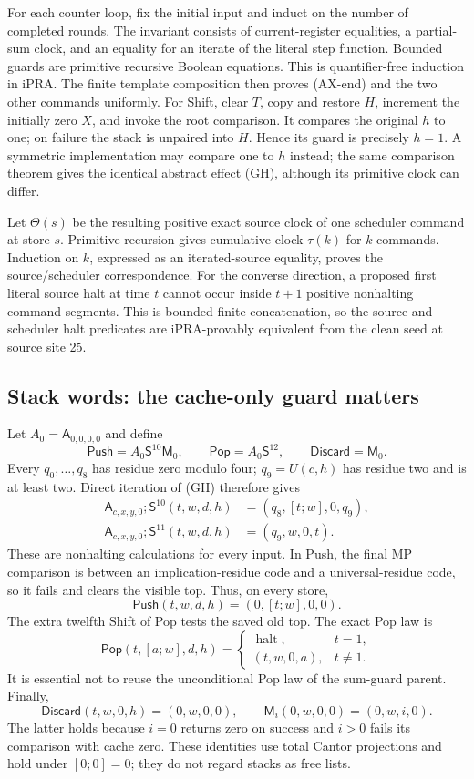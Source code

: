 For each counter loop, fix the initial input and induct on the number of
completed rounds.  The invariant consists of current-register equalities,
a partial-sum clock, and an equality for an iterate of the literal step
function.  Bounded guards are primitive recursive Boolean equations.
This is quantifier-free induction in iPRA.  The finite template composition
then proves (AX-end) and the two other commands uniformly.
For Shift, clear $T$, copy and restore $H$, increment the initially zero
$X$, and invoke the root comparison.  It compares the original $h$ to one;
on failure the stack is unpaired into $H$.  Hence its guard is precisely
$h=1$.  A symmetric implementation may compare one to $h$ instead; the
same comparison theorem gives the identical abstract effect (GH), although
its primitive clock can differ.

Let $\Theta(s)$ be the resulting positive exact source clock of one
scheduler command at store $s$.  Primitive recursion gives cumulative
clock $\tau(k)$ for $k$ commands.  Induction on $k$, expressed as an
iterated-source equality, proves the source/scheduler correspondence.  For
the converse direction, a proposed first literal source halt at time $t$
cannot occur inside $t+1$ positive nonhalting command segments.  This is
bounded finite concatenation, so the source and scheduler halt predicates
are iPRA-provably equivalent from the clean seed at source site 25.

\subsection{Stack words: the cache-only guard matters}

Let $A_0=\mathsf A_{0,0,0,0}$ and define
\[
 \mathsf{Push}=A_0\mathsf S^{10}\mathsf M_0,\qquad
 \mathsf{Pop}=A_0\mathsf S^{12},\qquad
 \mathsf{Discard}=\mathsf M_0.
\]
Every $q_0,\ldots,q_8$ has residue zero modulo four; $q_9=U(c,h)$ has
residue two and is at least two.  Direct iteration of (GH) therefore gives
\begin{align*}
 \mathsf A_{c,x,y,0};\mathsf S^{10}(t,w,d,h)
    &=(q_8,[t;w],0,q_9),\\
 \mathsf A_{c,x,y,0};\mathsf S^{11}(t,w,d,h)
    &=(q_9,w,0,t).
\end{align*}
These are nonhalting calculations for every input.  In Push, the final MP
comparison is between an implication-residue code and a universal-residue
code, so it fails and clears the visible top.  Thus, on every store,
\[
 \mathsf{Push}(t,w,d,h)=(0,[t;w],0,0).
\]
The extra twelfth Shift of Pop tests the saved old top.  The exact Pop law is
\[
 \mathsf{Pop}(t,[a;w],d,h)=
 \begin{cases}\operatorname{halt},&t=1,\\(t,w,0,a),&t\ne1.\end{cases} \tag{Pop}
\]
It is essential not to reuse the unconditional Pop law of the sum-guard
parent.  Finally,
\[
 \mathsf{Discard}(t,w,0,h)=(0,w,0,0),\qquad
 \mathsf M_i(0,w,0,0)=(0,w,i,0).
\]
The latter holds because $i=0$ returns zero on success and $i>0$ fails its
comparison with cache zero.  These identities use total Cantor projections
and hold under $[0;0]=0$; they do not regard stacks as free lists.

